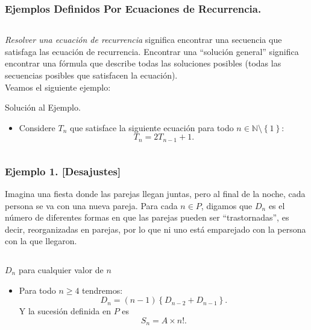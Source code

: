 \begin{frame}
\frametitle{Ejemplos Definidos Por Ecuaciones de Recurrencia.}
\begin{columns}
\begin{column}{\textwidth}
\textit{Resolver una ecuación de recurrencia} significa encontrar una secuencia que satisfaga las ecuación de recurrencia. Encontrar una ``solución general'' significa encontrar una fórmula que describe todas las soluciones posibles (todas las secuencias posibles que satisfacen la ecuación).\\
Veamos el siguiente ejemplo:
\begin{block}{Solución al Ejemplo.}
\begin{itemize}
	\item Considere $T_{n}$ que satisface la siguiente ecuación para todo $n \in\mathds{N}\setminus\left\{1\right\}$: \[ T_{n}=2T_{n-1}+1. \]
\end{itemize}
\end{block}
\end{column}
\end{columns}
\end{frame}

\begin{frame}
\frametitle{Ejemplo 1. [Desajustes]}
Imagina una fiesta donde las parejas llegan juntas, pero al final de la noche, cada persona se va con una nueva pareja. Para cada $n\in P$, digamos que $D_{n}$ es el número de diferentes formas en que las parejas pueden ser ``trastornadas'', es decir, reorganizadas en parejas, por lo que ni uno está emparejado con la persona con la que llegaron.

\begin{columns}
\begin{column}{\textwidth}
\begin{block}{$D_{n}$ para cualquier valor de $n$}
\begin{itemize}
\item Para todo $n \geq 4$ tendremos: \[ D_{n}=(n-1)\left\{D_{n-2}+D_{n-1}\right\}. \] Y la sucesión definida en $P$ es \[ S_{n} = A \times n!. \]
\end{itemize}
\end{block}
\end{column}
\end{columns}
\end{frame}

